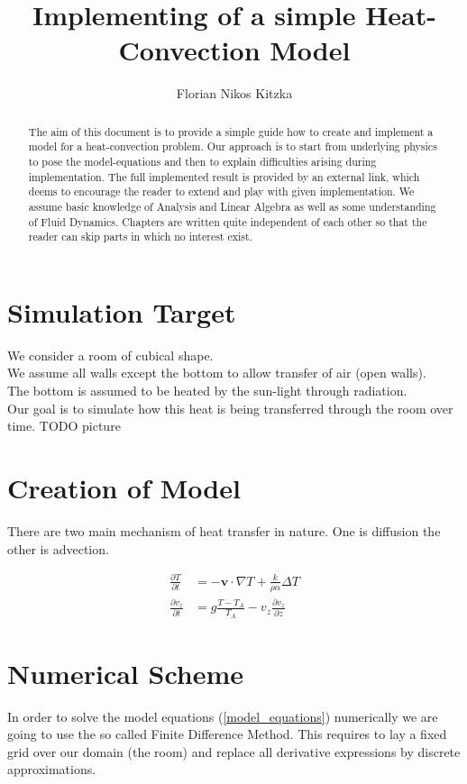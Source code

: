 \documentclass[]{article}
\title{Implementing of a simple Heat-Convection Model}
\author{Florian Nikos Kitzka}
\begin{document}
\maketitle

\begin{abstract}
The aim of this document is to provide a simple guide how to create and implement a model for a heat-convection problem. Our approach is to start from underlying physics to pose the model-equations and then to explain difficulties arising during implementation.
The full implemented result is provided by an external link, which deems to encourage the reader to extend and play with given implementation.
We assume basic knowledge of Analysis and Linear Algebra as well as some understanding of 
Fluid Dynamics. Chapters are written quite independent of each other so that the reader
can skip parts in which no interest exist. 
\end{abstract}

\section{Simulation Target}
We consider a room of cubical shape.\\
We assume all walls except the bottom to allow transfer of air (open walls).\\
The bottom is assumed to be heated by the sun-light through radiation.\\
Our goal is to simulate how this heat is being transferred through the room over time.
TODO picture

\section{Creation of Model}
There are two main mechanism of heat transfer in nature. One is diffusion the other is advection.


\begin{align} 
\frac{\partial T}{\partial t}&=-\textbf{v}\cdot \nabla T + \frac{k}{\rho\alpha}\Delta T \label{model_equations} \\
\frac{\partial v_{z}}{\partial t}&=g\frac{T-T_{A}}{T_{A}}-v_{z}\frac{\partial v_{z}}{\partial z} \nonumber
\end{align}

\section{Numerical Scheme}
In order to solve the model equations (\ref{model_equations}) numerically we are going to use the so called Finite Difference Method. This requires to lay a fixed grid over our domain (the room) and replace all derivative expressions by discrete approximations.
\end{document}
